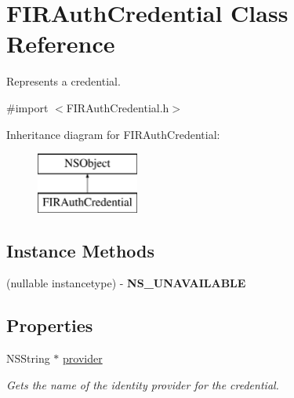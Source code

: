 \hypertarget{interface_f_i_r_auth_credential}{}\section{F\+I\+R\+Auth\+Credential Class Reference}
\label{interface_f_i_r_auth_credential}


Represents a credential.  




{\ttfamily \#import $<$F\+I\+R\+Auth\+Credential.\+h$>$}

Inheritance diagram for F\+I\+R\+Auth\+Credential\+:\begin{figure}[H]
\begin{center}
\leavevmode
\includegraphics[height=2.000000cm]{interface_f_i_r_auth_credential}
\end{center}
\end{figure}
\subsection*{Instance Methods}
\begin{DoxyCompactItemize}
\item 
\hypertarget{interface_f_i_r_auth_credential_ad4542fa9b502b065c18459371a606bd5}{}(nullable instancetype) -\/ {\bfseries N\+S\+\_\+\+U\+N\+A\+V\+A\+I\+L\+A\+B\+L\+E}\label{interface_f_i_r_auth_credential_ad4542fa9b502b065c18459371a606bd5}

\end{DoxyCompactItemize}
\subsection*{Properties}
\begin{DoxyCompactItemize}
\item 
\hypertarget{interface_f_i_r_auth_credential_a27e3840a8aff7e317c71151a0e879591}{}N\+S\+String $\ast$ \hyperlink{interface_f_i_r_auth_credential_a27e3840a8aff7e317c71151a0e879591}{provider}\label{interface_f_i_r_auth_credential_a27e3840a8aff7e317c71151a0e879591}

\begin{DoxyCompactList}\small\item\em Gets the name of the identity provider for the credential. \end{DoxyCompactList}\end{DoxyCompactItemize}


